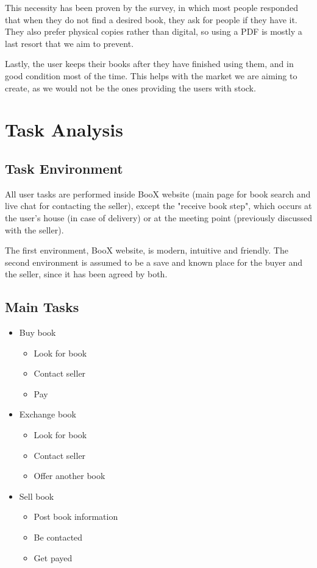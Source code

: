 \documentclass{article}
\begin{document}
This necessity has been proven by the survey, in which most people responded that when they do not find a desired book, they ask for people if they have it. They also prefer physical copies rather than digital, so using a PDF is mostly a last resort that we aim to prevent. 

Lastly, the user keeps their books after they have finished using them, and in good condition most of the time. This helps with the market we are aiming to create, as we would not be the ones providing the users with stock. 

\section{Task Analysis}
\subsection{Task Environment}
All user tasks are performed inside BooX website (main page for book search and live chat for contacting the seller), except the "receive book step", which occurs at the user's house (in case of delivery) or at the meeting point (previously discussed with the seller).

The first environment, BooX website, is modern, intuitive and friendly. The second environment is assumed to be a save and known place for the buyer and the seller, since it has been agreed by both.

\subsection{Main Tasks}
\begin{itemize}
    \item Buy book
        \begin{itemize}
            \item Look for book
            \item Contact seller
            \item Pay
        \end{itemize}
    \item Exchange book
    \begin{itemize}
            \item Look for book
            \item Contact seller
            \item Offer another book
        \end{itemize}
    \item Sell book
    \begin{itemize}
            \item Post book information
            \item Be contacted
            \item Get payed
        \end{itemize}
\end{itemize}
\end{document}
